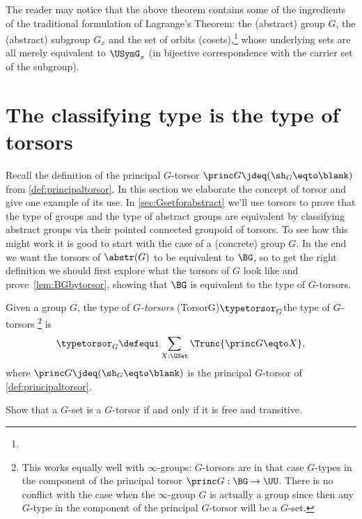 The reader may notice that the above theorem contains some of
the ingredients of the traditional formulation of Lagrange's Theorem:
the (abstract) group $G$, the (abstract) subgroup $G_x$
and the set of orbits (cosets),\footnote{%
} 
whose underlying sets are all merely equivalent to $\USymG_x$
(in bijective correspondence with the carrier set of the subgroup).



\section{The classifying type is the type of torsors}
\label{sec:torsors}
Recall the definition of the principal $G$-torsor 
$\princ G \jdeq (\sh_G \eqto \blank)$ from \cref{def:principaltorsor}.
In this section we elaborate the concept of torsor and give one example
of its use.
In \cref{sec:Gsetforabstract} we'll use torsors to prove that the type of groups and the type of abstract groups are equivalent by classifying abstract groups via their pointed connected groupoid of torsors.  To see how this might work it is good to start with the case of a (concrete) group $G$.
In the end we want the torsors of $\abstr(G)$ to be equivalent to $\BG$, so to get the right definition we should first explore what the torsors of $G$ look like and prove~\cref{lem:BGbytorsor}, showing that $\BG$ is equivalent to the type of $G$-torsors.
\begin{definition}\label{def:Gtorsor}
  Given a group $G$, the type of \emph{$G$-torsors}%
  \glossary(TorsorG){$\protect\typetorsor_G$}{the type of $G$-torsors}%
  \footnote{This works equally well with $\infty$-groups: $G$-torsors are in that case $G$-types in the component of the principal torsor $\princ G:\BG\to\UU$. There is no conflict with the case when the $\infty$-group $G$ is actually a group since then any $G$-type in the component of the principal $G$-torsor will be a $G$-set.}
  is
  \[
    \typetorsor_G\defequi\sum_{X:\GSet}\Trunc{\princ G \eqto X},
  \]
  where $\princ G \jdeq (\sh_G \eqto \blank)$ is the 
  principal $G$-torsor of \cref{def:principaltorsor}.
\end{definition}

\begin{xca}\label{xca:torsor=free+transitive}
  Show that a $G$-set is a $G$-torsor if and only if it is free and transitive.
\end{xca}


